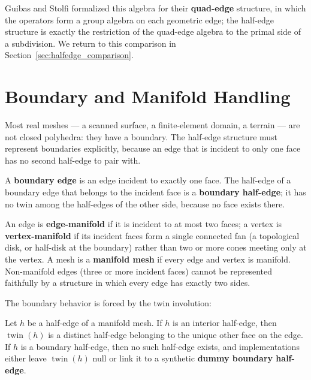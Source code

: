 \begin{remark}
Guibas and Stolfi \cite{guibas1985} formalized this algebra for their
\textbf{quad-edge} structure, in which the operators
form a group algebra on each geometric edge; the half-edge structure is
exactly the restriction of the quad-edge algebra to the primal side of a
subdivision. We return to this comparison in
Section~\ref{sec:halfedge_comparison}.
\end{remark}


\section{Boundary and Manifold Handling}
\label{sec:halfedge_boundary}

Most real meshes --- a scanned surface, a finite-element domain, a terrain
--- are not closed polyhedra: they have a boundary. The
half-edge structure must represent boundaries explicitly, because an edge
that is incident to only one face has no second half-edge to pair with.

\begin{definition}\label{def:hed_boundary_edge}
A \textbf{boundary edge} is an edge incident to exactly one face. The
half-edge of a boundary edge that belongs to the incident face is a
\textbf{boundary half-edge}; it has no twin among the half-edges of the
other side, because no face exists there.
\end{definition}

\begin{definition}\label{def:hed_manifold}
An edge is \textbf{edge-manifold} if it is incident to at most two faces; a
vertex is \textbf{vertex-manifold} if its incident faces form a single
connected fan (a topological disk, or half-disk at the boundary) rather
than two or more cones meeting only at the vertex. A mesh is a
\textbf{manifold mesh} if every edge and vertex is
manifold. Non-manifold edges (three or more incident faces) cannot be
represented faithfully by a structure in which every edge has exactly two
sides.
\end{definition}

The boundary behavior is forced by the twin involution:

\begin{theorem}\label{thm:hed_twin_boundary}
Let $h$ be a half-edge of a manifold mesh. If $h$ is an interior half-edge,
then $\operatorname{twin}(h)$ is a distinct half-edge belonging to the
unique other face on the edge. If $h$ is a boundary half-edge, then no such
half-edge exists, and implementations either leave
$\operatorname{twin}(h)$ null or link it to a synthetic
\textbf{dummy boundary half-edge}.
\end{theorem}

